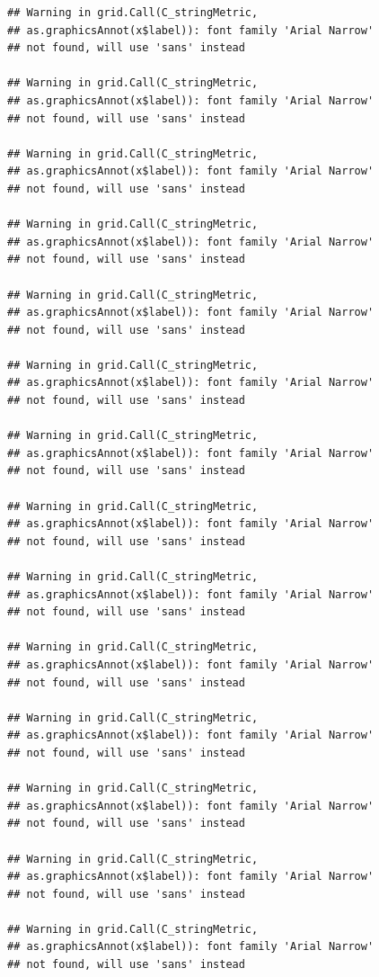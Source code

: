 \documentclass[]{krantz}
\begin{document}
\begin{verbatim}
## Warning in grid.Call(C_stringMetric,
## as.graphicsAnnot(x$label)): font family 'Arial Narrow'
## not found, will use 'sans' instead

## Warning in grid.Call(C_stringMetric,
## as.graphicsAnnot(x$label)): font family 'Arial Narrow'
## not found, will use 'sans' instead

## Warning in grid.Call(C_stringMetric,
## as.graphicsAnnot(x$label)): font family 'Arial Narrow'
## not found, will use 'sans' instead

## Warning in grid.Call(C_stringMetric,
## as.graphicsAnnot(x$label)): font family 'Arial Narrow'
## not found, will use 'sans' instead

## Warning in grid.Call(C_stringMetric,
## as.graphicsAnnot(x$label)): font family 'Arial Narrow'
## not found, will use 'sans' instead

## Warning in grid.Call(C_stringMetric,
## as.graphicsAnnot(x$label)): font family 'Arial Narrow'
## not found, will use 'sans' instead

## Warning in grid.Call(C_stringMetric,
## as.graphicsAnnot(x$label)): font family 'Arial Narrow'
## not found, will use 'sans' instead

## Warning in grid.Call(C_stringMetric,
## as.graphicsAnnot(x$label)): font family 'Arial Narrow'
## not found, will use 'sans' instead

## Warning in grid.Call(C_stringMetric,
## as.graphicsAnnot(x$label)): font family 'Arial Narrow'
## not found, will use 'sans' instead

## Warning in grid.Call(C_stringMetric,
## as.graphicsAnnot(x$label)): font family 'Arial Narrow'
## not found, will use 'sans' instead

## Warning in grid.Call(C_stringMetric,
## as.graphicsAnnot(x$label)): font family 'Arial Narrow'
## not found, will use 'sans' instead

## Warning in grid.Call(C_stringMetric,
## as.graphicsAnnot(x$label)): font family 'Arial Narrow'
## not found, will use 'sans' instead

## Warning in grid.Call(C_stringMetric,
## as.graphicsAnnot(x$label)): font family 'Arial Narrow'
## not found, will use 'sans' instead

## Warning in grid.Call(C_stringMetric,
## as.graphicsAnnot(x$label)): font family 'Arial Narrow'
## not found, will use 'sans' instead
\end{verbatim}
\end{document}
